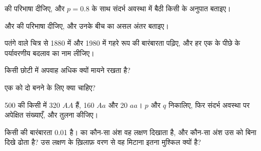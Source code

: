 \begin{exercise}[$\star$]\label{exo:g12:selection-drift-speciation:1}
 की परिभाषा दीजिए, और $p = 0.8$ के साथ संदर्भ अवस्था
में बैठी किसी  के  अनुपात बताइए।
\end{exercise}

\begin{exercise}[$\star$]\label{exo:g12:selection-drift-speciation:2}
 और  की परिभाषा दीजिए, और उनके बीच का असल अंतर
बताइए।
\end{exercise}

\begin{exercise}[$\star$]\label{exo:g12:selection-drift-speciation:3}
पतंगे वाले चित्र से 1880 में और 1980 में गहरे रूप की बारंबारता पढ़िए, और हर
एक के पीछे के पर्यावरणीय बदलाव का नाम लीजिए।
\end{exercise}

\begin{exercise}[$\star$]\label{exo:g12:selection-drift-speciation:4}
किसी छोटी  में अपवाह अधिक क्यों मायने रखता है?
\end{exercise}

\begin{exercise}[$\star$]\label{exo:g12:selection-drift-speciation:5}
एक  को दो  बनने के लिए क्या चाहिए?
\end{exercise}

\begin{exercise}[$\star\star$]\label{exo:g12:selection-drift-speciation:6}
500 की किसी  में 320 $AA$ हैं, 160 $Aa$ और 20 $aa$। $p$ और $q$
निकालिए, फिर संदर्भ अवस्था पर अपेक्षित  संख्याएँ, और तुलना कीजिए।
\end{exercise}

\begin{exercise}[$\star\star$]\label{exo:g12:selection-drift-speciation:7}
किसी   की बारंबारता 0.01 है।  का कौन-सा अंश वह
 लक्षण दिखाता है, और कौन-सा अंश उस  को बिना दिखे ढोता
है? उस लक्षण के ख़िलाफ़ वरण से वह  मिटाना इतना मुश्किल क्यों है?
\end{exercise}

